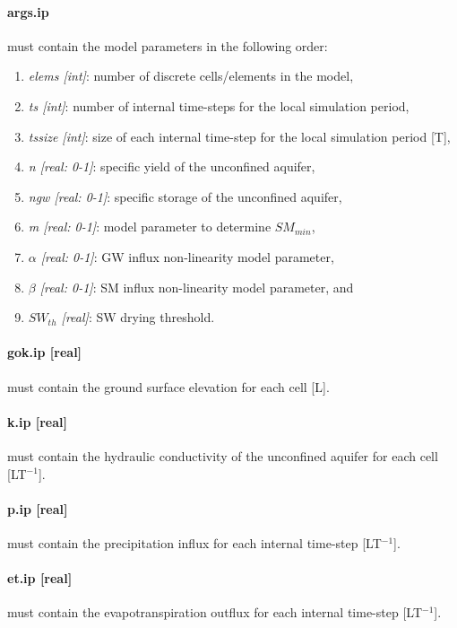 \paragraph*{args.ip} must contain the model parameters in the following order:
\begin{enumerate}
    \item \textit{elems [int]}: number of discrete cells/elements in the model,
    \item \textit{ts [int]}: number of internal time-steps for the local simulation period,
    \item \textit{ts\textunderscore size [int]}: size of each internal time-step for the local simulation period [T],
    \item \textit{n [real: 0-1]}: specific yield of the unconfined aquifer,
    \item \textit{n\textunderscore gw [real: 0-1]}: specific storage of the unconfined aquifer,
    \item \textit{m [real: 0-1]}: model parameter to determine $SM_{min}$,
    \item \textit{$\alpha$ [real: 0-1]}: GW influx non-linearity model parameter,
    \item \textit{$\beta$ [real: 0-1]}: SM influx non-linearity model parameter, and
    \item \textit{$SW_{th}$ [real]}: SW drying threshold.
\end{enumerate}

\paragraph*{gok.ip [real]} must contain the ground surface elevation for each cell [L].

\paragraph*{k.ip [real]} must contain the hydraulic conductivity of the unconfined aquifer for each cell [LT$^{-1}$].

\paragraph*{p.ip [real]} must contain the precipitation influx for each internal time-step [LT$^{-1}$].

\paragraph*{et.ip [real]} must contain the evapotranspiration outflux for each internal time-step [LT$^{-1}$].

